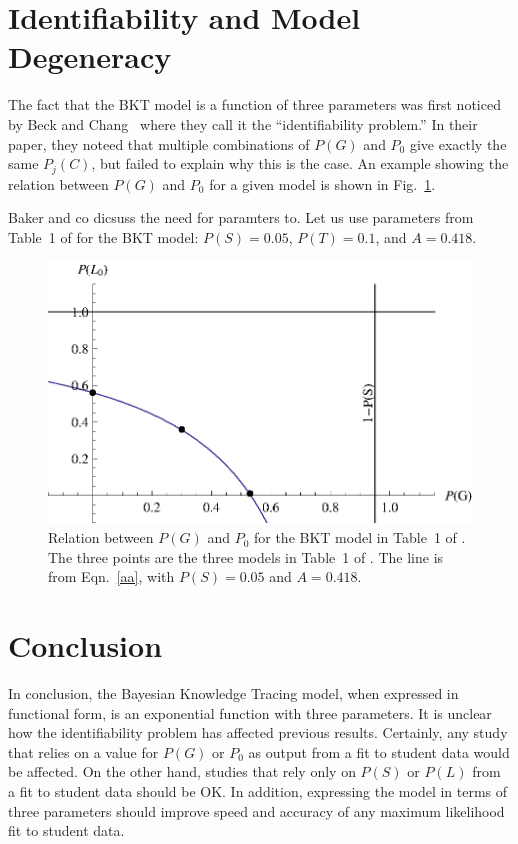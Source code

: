 \documentclass[11pt,letterpaper]{article}
\begin{document}
\section{Identifiability and Model Degeneracy}

The fact that the BKT model is a function of three parameters
was first noticed by Beck and Chang~\cite{beck_identifiability:_2007} 
where they call it the ``identifiability problem.''   In their paper, they noteed that multiple
combinations of $P(G)$ and $P_0$ give exactly the same $P_j(C)$, but
failed to explain why this is the case.  An example showing the relation
between $P(G)$ and $P_0$ for a given model is shown in Fig.~\ref{table1}.

Baker and co dicsuss the need for paramters to.
Let us use parameters from Table~1 of
\cite{beck_identifiability:_2007} for the BKT model: 
$P(S)=0.05$, $P(T)=0.1$, and $A=0.418$.

\begin{figure}
\centering\includegraphics{table1.eps}
\caption{Relation between $P(G)$ and $P_0$ for the BKT model in Table~1
  of \cite{beck_identifiability:_2007}.  The three points are the
  three models in Table~1 of \cite{beck_identifiability:_2007}.  The
  line is from Eqn.~\ref{aa}, with $P(S)=0.05$ and $A=0.418$. }
 \label{table1}
\end{figure}


\section{Conclusion}

In conclusion, the Bayesian Knowledge Tracing model, when expressed
in functional form, is an exponential function with three parameters.
It is unclear how the identifiability problem has affected previous
results.  Certainly, any study that relies on a value for $P(G)$ or
$P_0$ as output from a fit to student data would be affected.
On the other hand, studies that rely only on $P(S)$ or $P(L)$ from
a fit to student data should be OK.  In addition, expressing
the model in terms of three parameters should improve speed
and accuracy of any maximum likelihood fit to student data.
\end{document}
